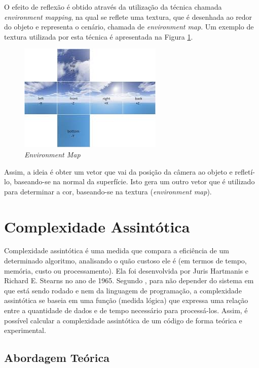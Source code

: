 {	O efeito de reflexão é obtido através da utilização da técnica chamada \textit{environment mapping}, na qual se reflete uma textura, que é desenhada ao redor do objeto e representa o cenário, chamada de \textit{environment map}. Um exemplo de textura utilizada por esta técnica é apresentada na Figura \ref{environment}.

	\begin{figure}[ht]
	\centering
		\includegraphics[keepaspectratio=true,scale=1.0]{figuras/envmap.jpg}
	\caption{\textit{Environment Map}}
	\label{environment}
	\end{figure}

	Assim, a ideia é obter um vetor que vai da posição da câmera ao objeto e refletí-lo, baseando-se na normal da superfície. Isto gera um outro vetor que é utilizado para determinar a cor, baseando-se na textura (\textit{environment map}).

\section{Complexidade Assintótica}
\label{metminquad}

	Complexidade assintótica é uma medida que compara a eficiência de um determinado algoritmo, analisando o quão custoso ele é (em termos de tempo, memória, custo ou processamento). Ela foi desenvolvida por Juris Hartmanis e Richard E. Stearns no ano de 1965. Segundo \cite{complexidade}, para não depender do sistema em que está sendo rodado e nem da linguagem de programação, a complexidade assintótica se baseia em uma função (medida lógica) que expressa uma relação entre a quantidade de dados e de tempo necessário para processá-los. Assim, é possível calcular a complexidade assintótica de um código de forma teórica e experimental.

	\subsection{Abordagem Teórica}

}
